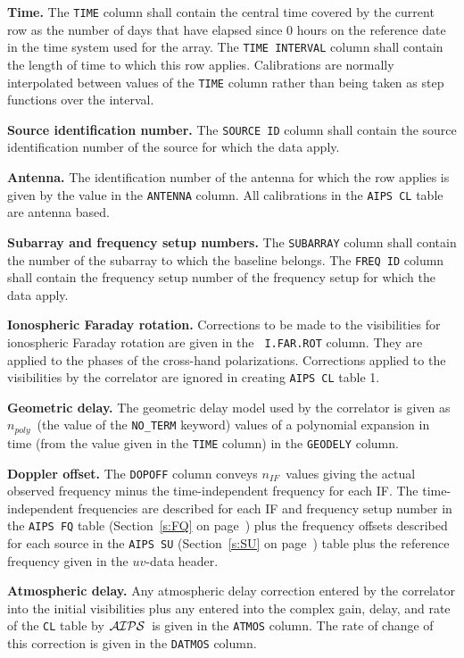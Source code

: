 \documentclass[twoside]{article}
\newcommand{\AIPS}{{$\cal AIPS\/$}}
\newcommand{\nif}{$n_{IF}$}
\newcommand{\npoly}{$n_{poly}$}
\begin{document}
{\bf Time.}  The {\tt TIME} column shall contain the central time
covered by the current row as the number of days that have elapsed
since 0 hours on the reference date in the time system used for the
array.  The {\tt TIME INTERVAL} column shall contain the length of
time to which this row applies.  Calibrations are normally
interpolated between values of the {\tt TIME} column rather than being
taken as step functions over the interval.

{\bf Source identification number.}  The {\tt SOURCE ID} column shall
contain the source identification number of the source for which the
data apply.

{\bf Antenna.} The identification number of the antenna for which the
row applies is given by the value in the {\tt ANTENNA} column.  All
calibrations in the {\tt AIPS CL} table are antenna based.

{\bf Subarray  and frequency setup numbers.} The {\tt SUBARRAY} column
shall contain the number of the subarray to which the baseline belongs.
The {\tt FREQ ID} column shall contain the frequency setup number of
the frequency setup for which the data apply.

{\bf Ionospheric Faraday rotation.} Corrections to be made to the
visibilities for ionospheric Faraday rotation are given in the {\tt
  I.FAR.ROT} column.  They are applied to the phases of the cross-hand
polarizations.  Corrections applied to the visibilities by the
correlator are ignored in creating {\tt AIPS CL} table 1.

{\bf Geometric delay.} The geometric delay model used by the
correlator is given as \npoly\ (the value of the {\tt NO\_TERM}
keyword) values of a polynomial expansion in time (from the value
given in the {\tt TIME} column) in the {\tt GEODELY} column.

{\bf Doppler offset.} The {\tt DOPOFF} column conveys \nif\ values
giving the actual observed frequency minus the time-independent
frequency for each IF.  The time-independent frequencies are described
for each IF and frequency setup number in the {\tt AIPS FQ} table
(Section~\ref{s:FQ} on page~\pageref{s:FQ}) plus the frequency offsets
described for each source in the {\tt AIPS SU} (Section~\ref{s:SU}
on page~\pageref{s:SU}) table plus the reference frequency given in
the $uv$-data header.

{\bf Atmospheric delay.} Any atmospheric delay correction entered by
the correlator into the initial visibilities plus any entered into the
complex gain, delay, and rate of the {\tt CL} table by \AIPS\ is given
in the {\tt ATMOS} column.  The rate of change of this correction is
given in the {\tt DATMOS} column.
\end{document}

